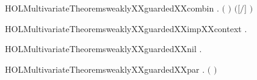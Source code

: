 \newcommand{\HOLMultivariateTheoremsweaklyXXguardedXXbackwardXXrules}{\UseVerbatim{HOLMultivariateTheoremsweaklyXXguardedXXbackwardXXrules}}
\begin{SaveVerbatim}{HOLMultivariateTheoremsweaklyXXguardedXXcombin}
\HOLTokenTurnstile{} \HOLSymConst{\HOLTokenForall{}}  .
         \HOLSymConst{\HOLTokenConj{}}    \HOLSymConst{\HOLTokenConj{}}    \HOLSymConst{\HOLTokenConj{}}
       \ensuremath{(}  \HOLSymConst{\ensuremath{=}}  \ensuremath{)} \HOLSymConst{\HOLTokenImp{}}
         \ensuremath{(}\ensuremath{[}\ensuremath{/}\ensuremath{]} \ensuremath{)}
\end{SaveVerbatim}
\newcommand{\HOLMultivariateTheoremsweaklyXXguardedXXcombin}{\UseVerbatim{HOLMultivariateTheoremsweaklyXXguardedXXcombin}}
\begin{SaveVerbatim}{HOLMultivariateTheoremsweaklyXXguardedXXimpXXcontext}
\HOLTokenTurnstile{} \HOLSymConst{\HOLTokenForall{}} .    \HOLSymConst{\HOLTokenImp{}}   
\end{SaveVerbatim}
\newcommand{\HOLMultivariateTheoremsweaklyXXguardedXXimpXXcontext}{\UseVerbatim{HOLMultivariateTheoremsweaklyXXguardedXXimpXXcontext}}
\begin{SaveVerbatim}{HOLMultivariateTheoremsweaklyXXguardedXXnil}
\HOLTokenTurnstile{} \HOLSymConst{\HOLTokenForall{}}.   
\end{SaveVerbatim}
\newcommand{\HOLMultivariateTheoremsweaklyXXguardedXXnil}{\UseVerbatim{HOLMultivariateTheoremsweaklyXXguardedXXnil}}
\begin{SaveVerbatim}{HOLMultivariateTheoremsweaklyXXguardedXXpar}
\HOLTokenTurnstile{} \HOLSymConst{\HOLTokenForall{}}  .
         \ensuremath{(} \HOLSymConst{\ensuremath{\mid}} \ensuremath{)} \HOLSymConst{\HOLTokenImp{}}
          \HOLSymConst{\HOLTokenConj{}}   
\end{SaveVerbatim}
